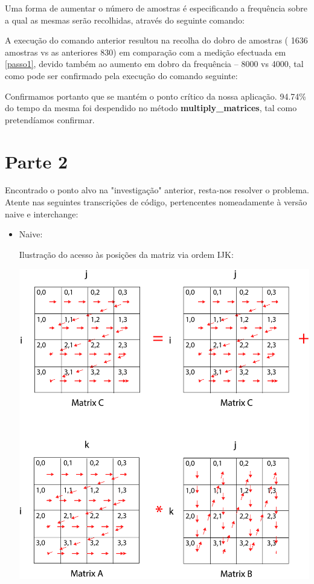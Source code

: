 \documentclass[conference,compsoc]{IEEEtran}
\begin{document}
\begin{itemize}
Uma forma de aumentar o número de amostras é especificando a frequência sobre a qual as mesmas serão recolhidas, através do seguinte comando: 


A execução do comando anterior resultou na recolha do dobro de amostras ( 1636 amostras vs as anteriores 830) em comparação com a medição efectuada em \ref{passo1}, devido também ao aumento em dobro da frequência -- 8000 vs 4000, tal como pode ser confirmado pela execução do comando seguinte: 


Confirmamos portanto que se mantém o ponto crítico da nossa aplicação. 94.74\% do tempo da mesma foi despendido no método \textbf{multiply\_matrices}, tal como pretendíamos confirmar. 

\section{Parte 2 }

Encontrado o ponto alvo na "investigação" anterior, resta-nos resolver o problema. Atente nas seguintes transcrições de código, pertencentes nomeadamente à versão naive e interchange:
\begin{itemize}
\item{ Naive: \par  %
Ilustração do acesso às posições da matriz via ordem IJK:\par 
      \includegraphics[width=0.75\columnwidth]{PNG/matrix_ijk_final.png}
      

}
\end{itemize}
\end{itemize}
\end{document}
